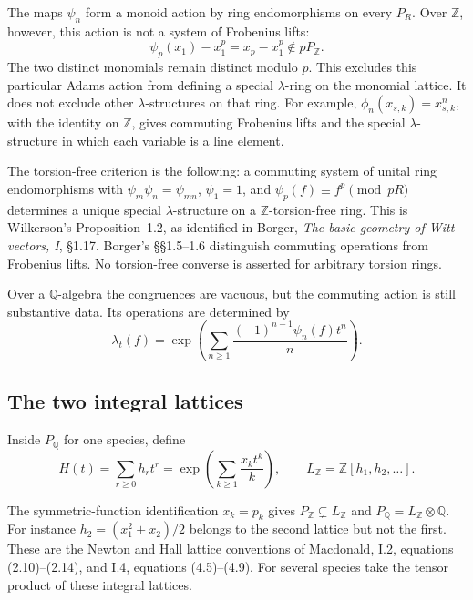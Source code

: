 \begin{proposition}
\label{v4-arith:thm:corrected-lambda-form}
The maps \(\psi_n\) form a monoid action by ring endomorphisms on every
\(P_R\). Over \(\mathbb Z\), however, this action is not a system of
Frobenius lifts:
\[
 \psi_p(x_1)-x_1^p=x_p-x_1^p\notin pP_{\mathbb Z}.
\]
\label{v4-arith:comp:wilkerson-test}
\label{v4-arith:obs:lattice-form-failure}
The two distinct monomials remain distinct modulo \(p\).
This excludes this particular Adams action from defining a special
\(\lambda\)-ring on the monomial lattice. It does not exclude other
\(\lambda\)-structures on that ring. For example,
\(\phi_n(x_{s,k})=x_{s,k}^n\), with the identity on \(\mathbb Z\), gives
commuting Frobenius lifts and the special \(\lambda\)-structure in which
each variable is a line element.
\end{proposition}


\begin{theorem}
\label{v4-arith:gb:wilkerson}
\label{v4-arith:thm:wilkerson}
The torsion-free criterion is the following:
a commuting system of unital ring endomorphisms with
\(\psi_m\psi_n=\psi_{mn}\), \(\psi_1=1\), and
\(\psi_p(f)\equiv f^p\pmod {pR}\) determines a unique special
\(\lambda\)-structure on a \(\mathbb Z\)-torsion-free ring.
This is Wilkerson's Proposition~1.2, as identified in Borger,
\emph{The basic geometry of Witt vectors, I}, \S1.17.
Borger's \S\S1.5--1.6 distinguish commuting operations from Frobenius
lifts. No torsion-free converse is asserted for arbitrary torsion rings.
\end{theorem}
\begin{observation}
\label{v4-arith:obs:vacuous-over-Q}
Over a \(\mathbb Q\)-algebra the congruences are vacuous, but the
commuting action is still substantive data. Its operations are determined by
\[
 \lambda_t(f)=\exp\left(\sum_{n\ge1}
             \frac{(-1)^{n-1}\psi_n(f)t^n}{n}\right).
\]

\end{observation}

\subsection{The two integral lattices}
\label{v4-arith:gb:macdonald-vs-fock-lattice}
Inside \(P_{\mathbb Q}\) for one species, define
\[
 H(t)=\sum_{r\ge0}h_rt^r
     =\exp\left(\sum_{k\ge1}\frac{x_kt^k}{k}\right),\qquad
 L_{\mathbb Z}=\mathbb Z[h_1,h_2,\ldots].
\]
\begin{observation}
\label{v4-arith:obs:fock-macdonald-Q}
\label{v4-arith:obs:lattice-mismatch-Z}
The symmetric-function identification \(x_k=p_k\) gives
\(P_{\mathbb Z}\subsetneq L_{\mathbb Z}\) and
\(P_{\mathbb Q}=L_{\mathbb Z}\otimes\mathbb Q\).
For instance \(h_2=(x_1^2+x_2)/2\) belongs to the second lattice but
not the first. These are the Newton and Hall lattice conventions of
Macdonald, I.2, equations (2.10)--(2.14), and I.4, equations (4.5)--(4.9).
For several species take the tensor product of these integral lattices.
\end{observation}

